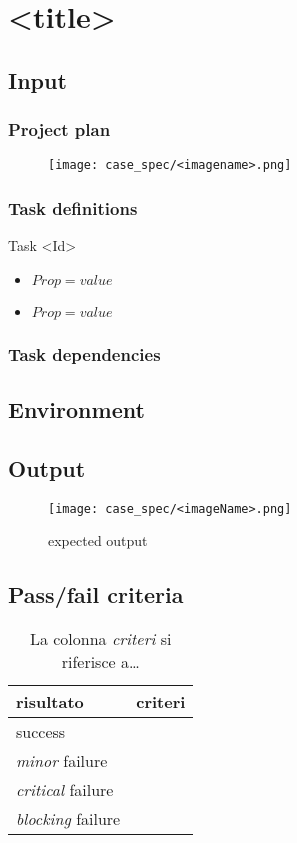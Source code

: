 \chapter{<title>}
\label{chap:<title>}

\section{Input}
\subsection{Project plan}
\begin{figure}[h!] 
\centering
\texttt{[image: case\_spec/<imagename>.png]}
\end{figure}

\subsection{Task definitions}
\begin{taksDef}{Task <Id>}
\begin{itemize}
  \item $Prop = value$
  \item $Prop = value$
\end{itemize}
\end{taksDef}

\subsection{Task dependencies}

\section{Environment}

\section{Output}
\begin{sidewaysfigure}[h!] 
\centering
\texttt{[image: case\_spec/<imageName>.png]}
\caption{expected output}
\end{sidewaysfigure}

\section{Pass/fail criteria}
\begin{table}[h!]
  \begin{center}
    \begin{tabular}{| l | l |}
    \hline
    \textbf{risultato} & \textbf{criteri} \\
	\hline    
	success &  \\
    \hline
    \emph{minor} failure & \\
    \hline
    \emph{critical} failure & \\
    \hline
    \emph{blocking} failure & \\
    \hline
    \end{tabular}
  \end{center}
	\caption{La colonna \emph{criteri} si riferisce a\ldots}
\end{table}